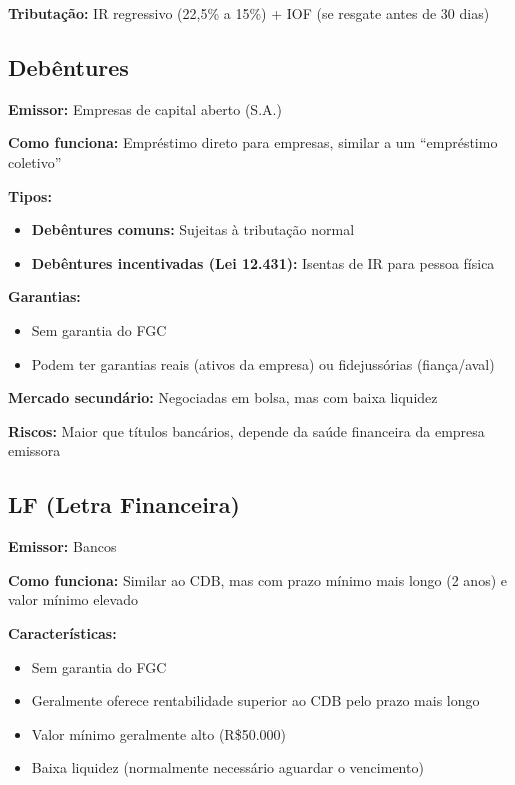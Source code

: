\textbf{Tributação:} IR regressivo (22,5\% a 15\%) + IOF (se resgate antes de 30 dias)

\subsection{Debêntures}
\label{subsec:debentures}

\textbf{Emissor:} Empresas de capital aberto (S.A.)

\textbf{Como funciona:} Empréstimo direto para empresas, similar a um ``empréstimo coletivo''

\textbf{Tipos:}
\begin{itemize}
    \item \textbf{Debêntures comuns:} Sujeitas à tributação normal
    \item \textbf{Debêntures incentivadas (Lei 12.431):} Isentas de IR para pessoa física
\end{itemize}

\textbf{Garantias:}
\begin{itemize}
    \item Sem garantia do FGC
    \item Podem ter garantias reais (ativos da empresa) ou fidejussórias (fiança/aval)
\end{itemize}

\textbf{Mercado secundário:} Negociadas em bolsa, mas com baixa liquidez

\textbf{Riscos:} Maior que títulos bancários, depende da saúde financeira da empresa emissora

\subsection{LF (Letra Financeira)}
\label{subsec:lf}

\textbf{Emissor:} Bancos

\textbf{Como funciona:} Similar ao CDB, mas com prazo mínimo mais longo (2 anos) e valor mínimo elevado

\textbf{Características:}
\begin{itemize}
    \item Sem garantia do FGC
    \item Geralmente oferece rentabilidade superior ao CDB pelo prazo mais longo
    \item Valor mínimo geralmente alto (R\$50.000)
    \item Baixa liquidez (normalmente necessário aguardar o vencimento)
\end{itemize}

